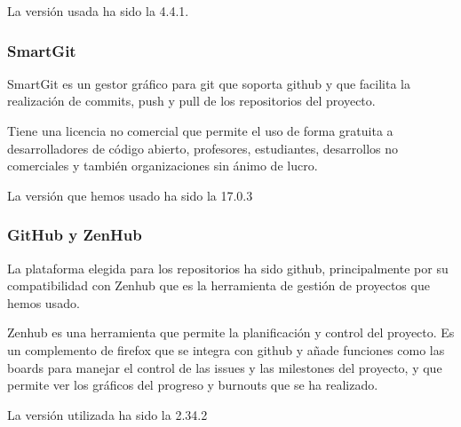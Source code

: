 La versión usada ha sido la 4.4.1.

\subsubsection{SmartGit}
SmartGit es un gestor gráfico para git que soporta github y que facilita la realización de commits, push y pull de los repositorios del proyecto.

Tiene una licencia no comercial que permite el uso de forma gratuita a desarrolladores de código abierto, profesores, estudiantes, desarrollos no comerciales y también organizaciones sin ánimo de lucro.

La versión que hemos usado ha sido la 17.0.3

\subsubsection{GitHub y ZenHub}
La plataforma elegida para los repositorios ha sido github, principalmente por su compatibilidad con Zenhub que es la herramienta de gestión de proyectos que hemos usado.

Zenhub es una herramienta que permite la planificación y control del proyecto. Es un complemento de firefox que se integra con github y añade funciones como las boards para manejar el control de las issues y las milestones del proyecto, y que permite ver los gráficos del progreso y burnouts que se ha realizado.

La versión utilizada ha sido la 2.34.2

